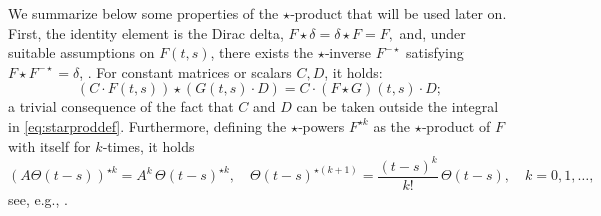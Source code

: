 \documentclass[final,1p,times,number]{elsarticle}
\theoremstyle{plain}%
\begin{document}
We summarize below some properties of the $\star$‑product that will be used later on.  
First, the identity element is the Dirac delta, \(F \star \delta = \delta \star F = F,\) and, under suitable assumptions on \(F(t,s)\), there exists the $\star$‑inverse \(F^{-\star}\) satisfying
\(F \star F^{-\star} = \delta\),  \cite{GiscardPozza,RycBouGis25}.
For constant matrices or scalars \(C, D\), it holds:
\[
  (C \cdot F(t,s)) \star (G(t,s) \cdot D) = C\cdot (F \star G)(t,s) \cdot D;
\]
 a trivial consequence of the fact that $C$ and $D$ can be taken outside the integral in \eqref{eq:starproddef}.
Furthermore, defining the $\star$‑powers \(F^{\star k}\) as the $\star$‑product of \(F\) with itself for $k$‑times, it holds
\begin{equation}\label{eq:star:powers}
  (A \Theta(t-s))^{\star k}
    = A^k\, \Theta(t-s)^{\star k},
  \quad
  \Theta(t-s)^{\star (k+1)}
    = \frac{(t-s)^{k}}{k!}\, \Theta(t-s),
  \quad k = 0,1,\dots,
\end{equation}
see, e.g., \cite{GisPoz23}.
\end{document}
